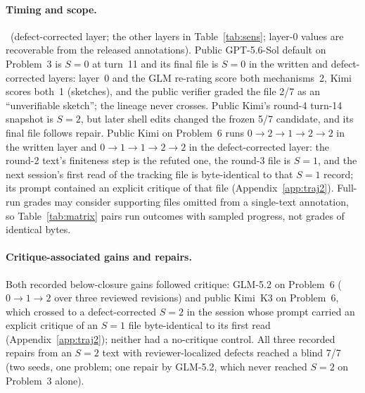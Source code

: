 \paragraph{Timing and scope.} \LINSTWO\ (defect-corrected layer; the other layers in Table~\ref{tab:sens}; layer-0 values are recoverable from the released annotations). Public GPT-5.6-Sol default on Problem~3 is $S{=}0$ at turn~11 and its final file is $S{=}0$ in the written and defect-corrected layers: layer~0 and the GLM re-rating score both mechanisms~2, Kimi scores both~1 (sketches), and the public verifier graded the file 2/7 as an ``unverifiable sketch''; the lineage never crosses. Public Kimi's round-4 turn-14 snapshot is $S{=}2$, but later shell edits changed the frozen 5/7 candidate, and its final file follows repair. Public Kimi on Problem~6 runs $0\to2\to1\to2\to2$ in the written layer and $0\to1\to1\to2\to2$ in the defect-corrected layer: the round-2 text's finiteness step is the refuted one, the round-3 file is $S{=}1$, and the next session's first read of the tracking file is byte-identical to that $S{=}1$ record; its prompt contained an explicit critique of that file (Appendix~\ref{app:traj2}). Full-run grades may consider supporting files omitted from a single-text annotation, so Table~\ref{tab:matrix} pairs run outcomes with sampled progress, not grades of identical bytes.

\paragraph{Critique-associated gains and repairs.} Both recorded below-closure gains followed critique: GLM-5.2 on Problem~6 ($0\to1\to2$ over three reviewed revisions) and public Kimi~K3 on Problem~6, which crossed to a defect-corrected $S{=}2$ in the session whose prompt carried an explicit critique of an $S{=}1$ file byte-identical to its first read (Appendix~\ref{app:traj2}); neither had a no-critique control. All three recorded repairs from an $S{=}2$ text with reviewer-localized defects reached a blind 7/7 (two seeds, one problem; one repair by GLM-5.2, which never reached $S{=}2$ on Problem~3 alone).


